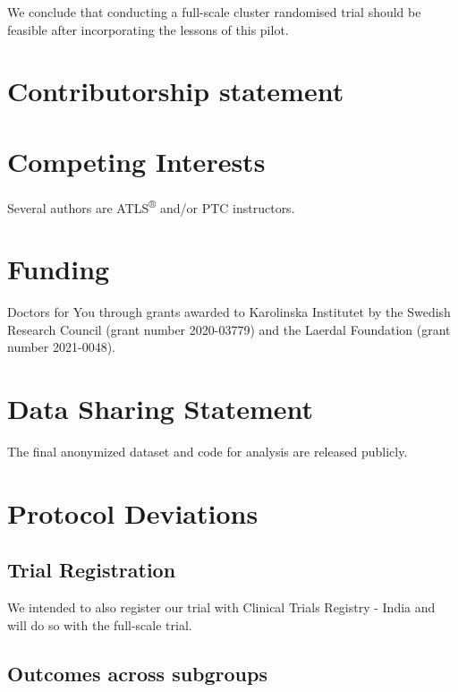 \documentclass[
]{article}
\begin{document}
We conclude that conducting a full-scale cluster randomised trial should be feasible after incorporating the lessons of this pilot.

\hypertarget{contributorship-statement}{%
\section{Contributorship statement}\label{contributorship-statement}}

\hypertarget{competing-interests}{%
\section{Competing Interests}\label{competing-interests}}

Several authors are ATLS\textsuperscript{®} and/or PTC instructors.

\hypertarget{funding}{%
\section{Funding}\label{funding}}

Doctors for You through grants awarded to Karolinska Institutet by the Swedish Research Council (grant number 2020-03779) and the Laerdal Foundation (grant number 2021-0048).

\hypertarget{data-sharing-statement}{%
\section{Data Sharing Statement}\label{data-sharing-statement}}

The final anonymized dataset and code for analysis are released publicly.

\hypertarget{protocol-deviations}{%
\section{Protocol Deviations}\label{protocol-deviations}}

\hypertarget{trial-registration-1}{%
\subsection{Trial Registration}\label{trial-registration-1}}

We intended to also register our trial with Clinical Trials Registry - India and will do so with the full-scale trial.

\hypertarget{outcomes-across-subgroups}{%
\subsection{Outcomes across subgroups}\label{outcomes-across-subgroups}}
\end{document}
